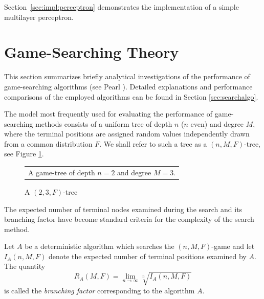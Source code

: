 Section~\ref{sec:impl:perceptron} demonstrates the implementation of a simple multilayer perceptron.







\section{Game-Searching Theory} \label{sec:gamesearching}
This section summarizes briefly analytical investigations of the performance of game-search\-ing algorithms (see Pearl \cite{Pearl84}). Detailed explanations and performance comparisons of the employed algorithms can be found in Section \ref{sec:searchalgo}.

The model most frequently used for evaluating the performance of game-searching methods consists of a uniform tree of depth $n$ ($n$ even) and degree $M$, where the terminal positions are assigned random values independently drawn from a common distribution $F$. We shall refer to such a tree as a $(n,M,F)$-tree, see Figure \ref{fig:tree}. 
\begin{figure}[htbp]
\begin{center}
\caption{A $(2,3,F)$-tree} 
\label{fig:tree}
\bigskip

\end{center}
\begin{center}
\footnotesize
\begin{tabular}{l}
A game-tree of depth $n=2$ and degree $M=3$.
\end{tabular}
\end{center}
\end{figure}
The expected number of terminal nodes examined during the search and its branching factor have become standard criteria for the complexity of the search method.
\begin{definition} 
Let $A$ be a deterministic algorithm which sear\-ches the $(n,M,F)$-game and let $I_A(n,M,F)$ denote the expected number of terminal positions examined by $A$. The quantity
\begin{equation}
R_A(M,F) = \lim_{n\rightarrow \infty} \sqrt[n]{I_A(n,M,F)}
\end{equation}
is called the \emph{branching factor} corresponding to the algorithm $A$.
\end{definition}


